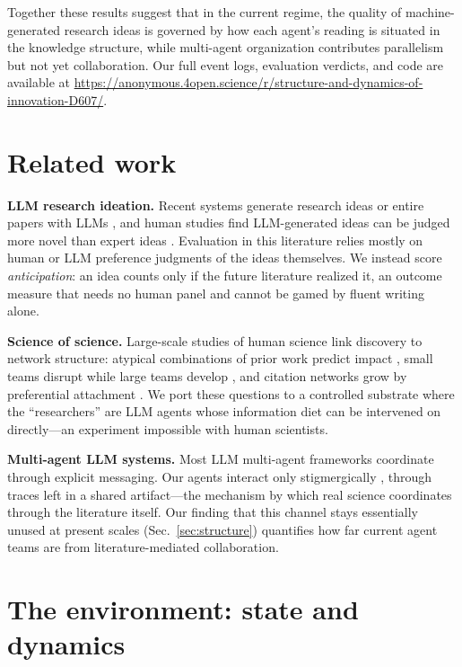 \documentclass{article} %
\begin{document}
Together these results suggest that in the current regime, the quality of
machine-generated research ideas is governed by how each agent's reading is
situated in the knowledge structure, while multi-agent organization
contributes parallelism but not yet collaboration. Our full event
logs, evaluation verdicts, and code are available at
\url{https://anonymous.4open.science/r/structure-and-dynamics-of-innovation-D607/}.

\section{Related work}

\textbf{LLM research ideation.} Recent systems generate research ideas or
entire papers with LLMs \citep{lu2024aiscientist}, and human studies find
LLM-generated ideas can be judged more novel than expert ideas
\citep{si2024llmideas}. Evaluation in this literature relies mostly on
human or LLM preference judgments of the ideas themselves. We instead
score \emph{anticipation}: an idea counts only if the future literature
realized it, an outcome measure that needs no human panel and cannot be
gamed by fluent writing alone.

\textbf{Science of science.} Large-scale studies of human science link
discovery to network structure: atypical combinations of prior work
predict impact \citep{uzzi2013atypical}, small teams disrupt while large
teams develop \citep{wu2019teams}, and citation networks grow by
preferential attachment \citep{barabasi1999emergence,fortunato2018science}.
We port these questions to a controlled substrate where the ``researchers''
are LLM agents whose information diet can be intervened on directly---an
experiment impossible with human scientists.

\textbf{Multi-agent LLM systems.} Most LLM multi-agent frameworks
coordinate through explicit messaging. Our agents interact only
stigmergically \citep{theraulaz1999stigmergy}, through traces left in a
shared artifact---the mechanism by which real science coordinates through
the literature itself. Our finding that this channel stays essentially
unused at present scales (Sec.~\ref{sec:structure}) quantifies how far
current agent teams are from literature-mediated collaboration.

\section{The environment: state and dynamics}
\label{sec:framework}
\end{document}
